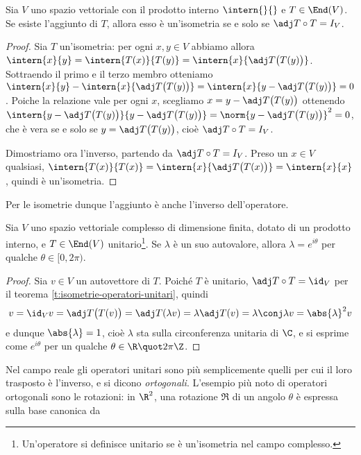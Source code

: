 \begin{teorema} \label{t:isometrie-operatori-unitari}
	Sia $V$ uno spazio vettoriale con il prodotto interno $\intern{}{}$ e $T\in\End(V)$.
	Se esiste l'aggiunto di $T$, allora esso è un'isometria se e solo se $\adj T\circ T= I_V$.
\end{teorema}
\begin{proof}
	Sia $T$ un'isometria: per ogni $  x,  y\in V$ abbiamo allora $\intern{  x}{  y}=\intern{T(  x)}{T(  y)}=\intern{  x}{\adj T\big(T(  y)\big)}$.
	Sottraendo il primo e il terzo membro otteniamo $\intern{  x}{  y}-\intern{  x}{\adj T\big(T(  y)\big)}=\intern{  x}{  y-\adj T\big(T(  y)\big)}=0$.
	Poiche la relazione vale per ogni $  x$, scegliamo $  x=  y-\adj T\big(T(  y)\big)$ ottenendo $\intern{  y-\adj T\big(T(  y)\big)}{  y-\adj T\big(T(  y)\big)}=\norm{  y-\adj T\big(T(  y)\big)}^2=0$, che è vera se e solo se $  y=\adj T\big(T(  y)\big)$, cioè $\adj T\circ T= I_V$.

	Dimostriamo ora l'inverso, partendo da $\adj T\circ T= I_V$.
	Preso un $  x\in V$ qualsiasi, $\intern{T(  x)}{T(  x)}=\intern{  x}{\adj T\big(T(  x)\big)}=\intern{  x}{  x}$, quindi è un'isometria.
\end{proof}
Per le isometrie dunque l'aggiunto è anche l'inverso dell'operatore.
\begin{teorema} \label{t:autovalori-operatori-unitari}
	Sia $V$ uno spazio vettoriale complesso di dimensione finita, dotato di un prodotto interno, e $T\in\End(V)$ unitario\footnote{Un'operatore si definisce unitario se è un'isometria nel campo complesso.}.
	Se $\lambda$ è un suo autovalore, allora $\lambda=e^{i\theta}$ per qualche $\theta\in[0,2\pi)$.
\end{teorema}
\begin{proof}
	Sia $  v\in V$ un autovettore di $T$.
	Poich\'e $T$ è unitario, $\adj T\circ T=\id_V$ per il teorema \ref{t:isometrie-operatori-unitari}, quindi
	\begin{equation}
		  v=\id_V  v=\adj T\big(T(  v)\big)=\adj T(\lambda  v)=\lambda\adj T(  v)=\lambda\conj\lambda  v=\abs{\lambda}^2  v
	\end{equation}
	e dunque $\abs{\lambda}=1$, cioè $\lambda$ sta sulla circonferenza unitaria di $\C$, e si esprime come $e^{i\theta}$ per un qualche $\theta\in\R\quot2\pi\Z$.
\end{proof}
Nel campo reale gli operatori unitari sono più semplicemente quelli per cui il loro trasposto è l'inverso, e si dicono \emph{ortogonali}.
L'esempio più noto di operatori ortogonali sono le rotazioni: in $\R^2$, una rotazione $\mathfrak R$ di un angolo $\theta$ è espressa sulla base canonica da
